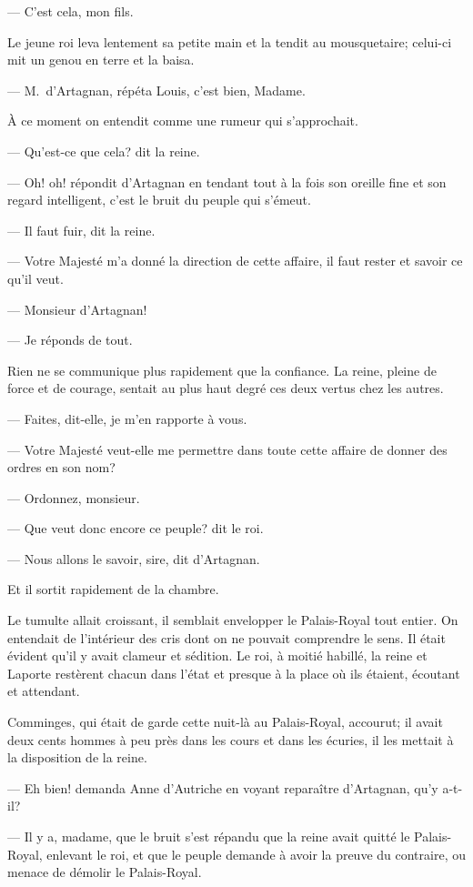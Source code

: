 — C'est cela, mon fils.

Le jeune roi leva lentement sa petite main et la tendit au mousquetaire; celui-ci mit un genou en terre et la baisa.

— M.~d'Artagnan, répéta Louis, c'est bien, Madame.

À ce moment on entendit comme une rumeur qui s'approchait.

— Qu'est-ce que cela? dit la reine.

— Oh! oh! répondit d'Artagnan en tendant tout à la fois son oreille fine et son regard intelligent, c'est le bruit du peuple qui s'émeut.

— Il faut fuir, dit la reine.

— Votre Majesté m'a donné la direction de cette affaire, il faut rester et savoir ce qu'il veut.

— Monsieur d'Artagnan!

— Je réponds de tout.

Rien ne se communique plus rapidement que la confiance. La reine, pleine de force et de courage, sentait au plus haut degré ces deux vertus chez les autres.

— Faites, dit-elle, je m'en rapporte à vous.

— Votre Majesté veut-elle me permettre dans toute cette affaire de donner des ordres en son nom?

— Ordonnez, monsieur.

— Que veut donc encore ce peuple? dit le roi.

— Nous allons le savoir, sire, dit d'Artagnan.

Et il sortit rapidement de la chambre.

Le tumulte allait croissant, il semblait envelopper le Palais-Royal tout entier. On entendait de l'intérieur des cris dont on ne pouvait comprendre le sens. Il était évident qu'il y avait clameur et sédition. Le roi, à moitié habillé, la reine et Laporte restèrent chacun dans l'état et presque à la place où ils étaient, écoutant et attendant.

Comminges, qui était de garde cette nuit-là au Palais-Royal, accourut; il avait deux cents hommes à peu près dans les cours et dans les écuries, il les mettait à la disposition de la reine.

— Eh bien! demanda Anne d'Autriche en voyant reparaître d'Artagnan, qu'y a-t-il?

— Il y a, madame, que le bruit s'est répandu que la reine avait quitté le Palais-Royal, enlevant le roi, et que le peuple demande à avoir la preuve du contraire, ou menace de démolir le Palais-Royal.

